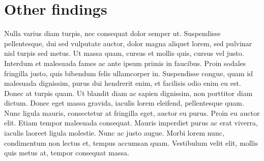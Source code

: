 \section{Other findings}

Nulla varius diam turpis, nec consequat dolor semper ut. Suspendisse
pellentesque, dui sed vulputate auctor, dolor magna aliquet lorem, sed
pulvinar nisl turpis sed metus. Ut massa quam, cursus et mollis quis, cursus
vel justo. Interdum et malesuada fames ac ante ipsum primis in faucibus.
Proin sodales fringilla justo, quis bibendum felis ullamcorper in.
Suspendisse congue, quam id malesuada dignissim, purus dui hendrerit enim,
et facilisis odio enim eu est. Donec at turpis quam. Ut blandit diam ac
sapien dignissim, non porttitor diam dictum. Donec eget massa gravida,
iaculis lorem eleifend, pellentesque quam. Nunc ligula mauris, consectetur
at fringilla eget, auctor eu purus. Proin eu auctor elit. Etiam tempor
malesuada consequat. Mauris imperdiet purus ac erat viverra, iaculis laoreet
ligula molestie. Nunc ac justo augue. Morbi lorem nunc, condimentum non
lectus et, tempus accumsan quam. Vestibulum velit elit, mollis quis metus
at, tempor consequat massa.

